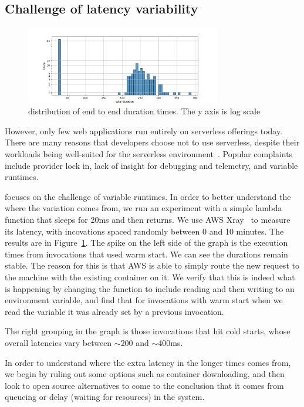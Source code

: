 \subsection{Challenge of latency variability}


\begin{figure}[t!]
    \centering
      \includegraphics[width=8.5cm]{img/lambda_total_durations.png}
      \caption{ distribution of end to end duration times. The y axis is log scale }
    \label{fig:lambda-total-durations}
\end{figure}

However, only few web applications run entirely on serverless offerings today.
There are many reasons that developers choose not to use serverless, despite
their workloads being well-suited for the serverless
environment~\cite{not-lambda-blog,reddit-serverless2}. Popular complaints
include provider lock in, lack of insight for debugging and telemetry, and
variable runtimes.


\Sys{} focuses on the challenge of variable runtimes. In order to better
understand the where the variation comes from, we run an experiment with a
simple lambda function that sleeps for 20ms and then returns. We use AWS
Xray~\cite{aws-xray} to measure its latency, with incovations spaced randomly
between 0 and 10 minutes. The results are in
Figure~\ref{fig:lambda-total-durations}. The spike on the left side of the graph
is the execution times from invocations that used warm start. We can see the
durations remain stable. The reason for this is that AWS is able to simply route
the new request to the machine with the existing container on it. We verify that
this is indeed what is happening by changing the function to include reading and
then writing to an environment variable, and find that for invocations with warm
start when we read the variable it was already set by a previous invocation.


The right grouping in the graph is those invocations that hit cold starts, whose
overall latencies vary between $\sim$200 and $\sim$400ms.


In order to understand where the extra latency in the longer times comes from,
we begin by ruling out some options such as container downloading, and then look
to open source alternatives to come to the conclusion that it comes from
queueing or delay (waiting for resources) in the system.

